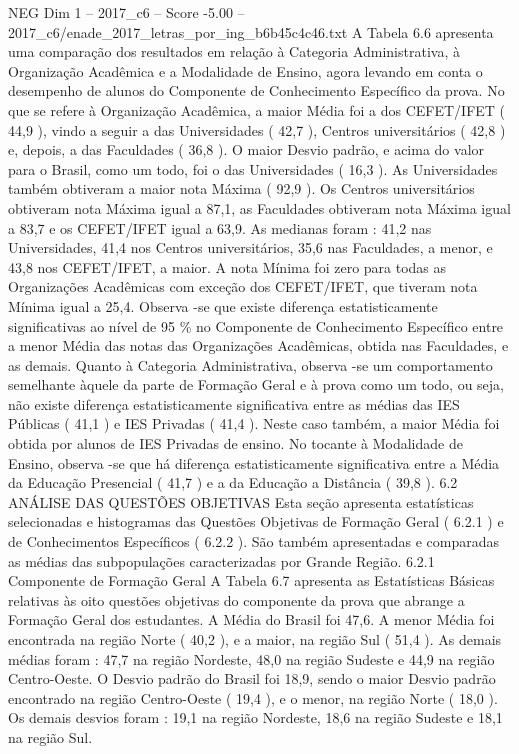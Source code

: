 \begin{textsample}{NEG Dim 1 – 2017\_c6 – Score -5.00 – 2017\_c6/enade\_2017\_letras\_por\_ing\_b6b45c4c46.txt}
A Tabela 6.6 apresenta uma comparação dos resultados em relação à Categoria Administrativa, à Organização Acadêmica e a Modalidade de Ensino, agora levando em conta o desempenho de alunos do Componente de Conhecimento Específico da prova.
No que se refere à Organização Acadêmica, a maior Média foi a dos CEFET/IFET ( 44,9 ), vindo a seguir a das Universidades ( 42,7 ), Centros universitários ( 42,8 ) e, depois, a das Faculdades ( 36,8 ).
O maior Desvio padrão, e acima do valor para o Brasil, como um todo, foi o das Universidades ( 16,3 ).
As Universidades também obtiveram a maior nota Máxima ( 92,9 ).
Os Centros universitários obtiveram nota Máxima igual a 87,1, as Faculdades obtiveram nota Máxima igual a 83,7 e os CEFET/IFET igual a 63,9.
As medianas foram : 41,2 nas Universidades, 41,4 nos Centros universitários, 35,6 nas Faculdades, a menor, e 43,8 nos CEFET/IFET, a maior.
A nota Mínima foi zero para todas as Organizações Acadêmicas com exceção dos CEFET/IFET, que tiveram nota Mínima igual a 25,4.
Observa -se que existe diferença estatisticamente significativas ao nível de 95 \% no Componente de Conhecimento Específico entre a menor Média das notas das Organizações Acadêmicas, obtida nas Faculdades, e as demais.
Quanto à Categoria Administrativa, observa -se um comportamento semelhante àquele da parte de Formação Geral e à prova como um todo, ou seja, não existe diferença estatisticamente significativa entre as médias das IES Públicas ( 41,1 ) e IES Privadas ( 41,4 ).
Neste caso também, a maior Média foi obtida por alunos de IES Privadas de ensino.
No tocante à Modalidade de Ensino, observa -se que há diferença estatisticamente significativa entre a Média da Educação Presencial ( 41,7 ) e a da Educação a Distância ( 39,8 ). 6.2 ANÁLISE DAS QUESTÕES OBJETIVAS Esta seção apresenta estatísticas selecionadas e histogramas das Questões Objetivas de Formação Geral ( 6.2.1 ) e de Conhecimentos Específicos ( 6.2.2 ).
São também apresentadas e comparadas as médias das subpopulações caracterizadas por Grande Região. 6.2.1 Componente de Formação Geral A Tabela 6.7 apresenta as Estatísticas Básicas relativas às oito questões objetivas do componente da prova que abrange a Formação Geral dos estudantes.
A Média do Brasil foi 47,6.
A menor Média foi encontrada na região Norte ( 40,2 ), e a maior, na região Sul ( 51,4 ).
As demais médias foram : 47,7 na região Nordeste, 48,0 na região Sudeste e 44,9 na região Centro-Oeste.
O Desvio padrão do Brasil foi 18,9, sendo o maior Desvio padrão encontrado na região Centro-Oeste ( 19,4 ), e o menor, na região Norte ( 18,0 ).
Os demais desvios foram : 19,1 na região Nordeste, 18,6 na região Sudeste e 18,1 na região Sul.

\end{textsample}
